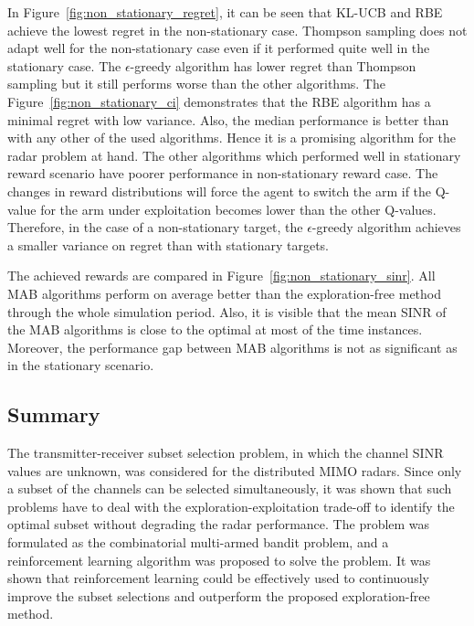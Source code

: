 \documentclass[english, 12pt, a4paper, elec, utf8, a-1b, online]{aaltothesis}
\numberwithin{equation}{section}
\begin{document}
In Figure~\ref{fig:non_stationary_regret}, it can be seen that KL-UCB and RBE achieve the lowest regret in the non-stationary case.
Thompson sampling does not adapt well for the non-stationary case even if it performed quite well in the stationary case.
The $\epsilon$-greedy algorithm has lower regret than Thompson sampling but it still performs worse than the other algorithms. 
The Figure~\ref{fig:non_stationary_ci} demonstrates that the RBE algorithm has a minimal regret with low variance.
Also, the median performance is better than with any other of the used algorithms.
Hence it is a promising algorithm for the radar problem at hand. 
The other algorithms which performed well in stationary reward scenario have poorer performance in non-stationary reward case.
The changes in reward distributions will force the agent to switch the arm if the Q-value for the arm under exploitation becomes lower than the other Q-values.
Therefore, in the case of a non-stationary target, the $\epsilon$-greedy algorithm achieves a smaller variance on regret than with stationary targets.

The achieved rewards are compared in Figure~\ref{fig:non_stationary_sinr}.
All MAB algorithms perform on average better than the exploration-free method through the whole simulation period.
Also, it is visible that the mean SINR of the MAB algorithms is close to the optimal at most of the time instances. 
Moreover, the performance gap between MAB algorithms is not as significant as in the stationary scenario.

\subsection{Summary}
\label{sec:tx_rx_summary}

The transmitter-receiver subset selection problem, in which the channel SINR values are unknown, was considered for the distributed MIMO radars.
Since only a subset of the channels can be selected simultaneously, it was shown that such problems have to deal with the exploration-exploitation trade-off to identify the optimal subset without degrading the radar performance.
The problem was formulated as the combinatorial multi-armed bandit problem, and a reinforcement learning algorithm was proposed to solve the problem.
It was shown that reinforcement learning could be effectively used to continuously improve the subset selections and outperform the proposed exploration-free method.
\end{document}
